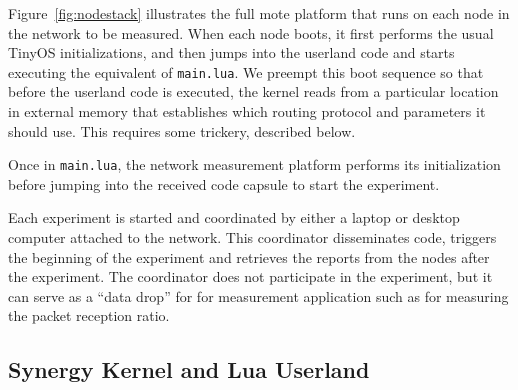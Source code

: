 Figure~\ref{fig:nodestack} illustrates the full mote platform that runs on each node in the network to be measured. 
When each node boots, it first performs the usual TinyOS initializations, and then jumps into the userland code and starts executing the equivalent of \texttt{main.lua}.
We preempt this boot sequence so that before the userland code is executed, the kernel reads from a particular location in external memory that establishes which routing protocol and parameters it should use.
This requires some trickery, described below.

Once in \texttt{main.lua}, the network measurement platform performs its initialization before jumping into the received code capsule to start the experiment.

Each experiment is started and coordinated by either a laptop or desktop computer attached to the network.
This coordinator disseminates code, triggers the beginning of the experiment and retrieves the reports from the nodes after the experiment.
The coordinator does not participate in the experiment, but it can serve as a ``data drop'' for for measurement application such as for measuring the packet reception ratio.

\subsection{Synergy Kernel and Lua Userland}

